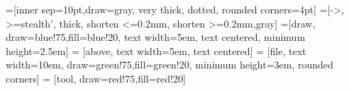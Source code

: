 

%

=[inner sep=10pt,draw=gray, very thick, dotted, rounded corners=4pt]
=[->, >=stealth', thick, shorten <=0.2mm, shorten >=0.2mm,gray]
=[draw, draw=blue!75,fill=blue!20, text width=5em, 
    text centered, minimum height=2.5em]
 = [above, text width=5em, text centered]
 = [file, text width=10em, draw=green!75,fill=green!20, 
    minimum height=3em, rounded corners]
 = [tool, draw=red!75,fill=red!20]
    
